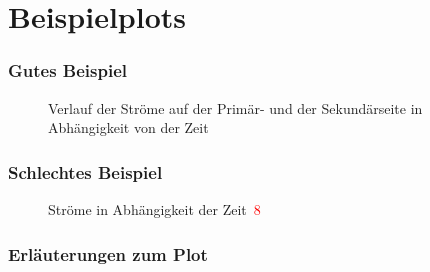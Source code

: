 \section*{Beispielplots}

\subsubsection{Gutes Beispiel}

\begin{figure}[!ht]
	\centering
	\setlength\figureheight{7cm}
	\setlength\figurewidth{13cm}
	
	\caption{Verlauf der Str\"ome auf der Primär- und der Sekundärseite in Abh\"angigkeit von der Zeit} 
	\label{abb:stromverlauf_gutes_bsp}
\end{figure}


\subsubsection{Schlechtes Beispiel}

\begin{figure}[!ht]
	\centering
	\setlength\figureheight{7cm}
	\setlength\figurewidth{14cm}
	
	\caption{Str\"ome in Abh\"angigkeit der Zeit~\Huge\textcolor{red}{8}} 
	\label{abb:stromverlauf_schlechtes_bsp}
\end{figure}

\newpage


\subsubsection{Erläuterungen zum Plot}

